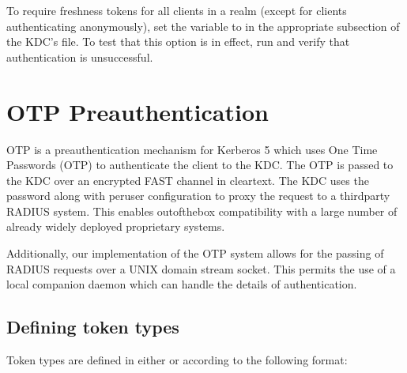 \documentclass[letterpaper,10pt,english]{sphinxmanual}
\begin{document}
\begin{sphinxVerbatim}[commandchars=\\\{\}]
      
       
\end{sphinxVerbatim}

\sphinxAtStartPar
To require freshness tokens for all clients in a realm (except for
clients authenticating anonymously), set the
 variable to  in the appropriate
{\hyperref[\detokenize{admin/conf_files/kdc_conf:kdc-realms}]{}} subsection of the KDC’s {\hyperref[\detokenize{admin/conf_files/kdc_conf:kdc-conf-5}]{}} file.  To
test that this option is in effect, run 
and verify that authentication is unsuccessful.


\chapter{OTP Preauthentication}
\label{\detokenize{admin/otp:otp-preauthentication}}\label{\detokenize{admin/otp:otp-preauth}}\label{\detokenize{admin/otp::doc}}
\sphinxAtStartPar
OTP is a preauthentication mechanism for Kerberos 5 which uses One
Time Passwords (OTP) to authenticate the client to the KDC.  The OTP
is passed to the KDC over an encrypted FAST channel in clear\sphinxhyphen{}text.
The KDC uses the password along with per\sphinxhyphen{}user configuration to proxy
the request to a third\sphinxhyphen{}party RADIUS system.  This enables
out\sphinxhyphen{}of\sphinxhyphen{}the\sphinxhyphen{}box compatibility with a large number of already widely
deployed proprietary systems.

\sphinxAtStartPar
Additionally, our implementation of the OTP system allows for the
passing of RADIUS requests over a UNIX domain stream socket.  This
permits the use of a local companion daemon which can handle the
details of authentication.


\section{Defining token types}
\label{\detokenize{admin/otp:defining-token-types}}
\sphinxAtStartPar
Token types are defined in either {\hyperref[\detokenize{admin/conf_files/krb5_conf:krb5-conf-5}]{}} or
{\hyperref[\detokenize{admin/conf_files/kdc_conf:kdc-conf-5}]{}} according to the following format:
\end{document}
